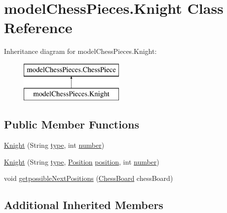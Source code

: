 \hypertarget{classmodel_chess_pieces_1_1_knight}{\section{model\+Chess\+Pieces.\+Knight Class Reference}
\label{classmodel_chess_pieces_1_1_knight}
}
Inheritance diagram for model\+Chess\+Pieces.\+Knight\+:\begin{figure}[H]
\begin{center}
\leavevmode
\includegraphics[height=2.000000cm]{classmodel_chess_pieces_1_1_knight}
\end{center}
\end{figure}
\subsection*{Public Member Functions}
\begin{DoxyCompactItemize}
\item 
\hyperlink{classmodel_chess_pieces_1_1_knight_a147ddcbdf9160932c8b0b386db3954eb}{Knight} (String \hyperlink{classmodel_chess_pieces_1_1_chess_piece_a195487ca88c197af7c1604247be31db2}{type}, int \hyperlink{classmodel_chess_pieces_1_1_chess_piece_a979e63b99128333883acedc38d25dc87}{number})
\item 
\hyperlink{classmodel_chess_pieces_1_1_knight_ac3d5048db997f503429d11d455db2c42}{Knight} (String \hyperlink{classmodel_chess_pieces_1_1_chess_piece_a195487ca88c197af7c1604247be31db2}{type}, \hyperlink{classmodel_core_1_1_position}{Position} \hyperlink{classmodel_chess_pieces_1_1_chess_piece_a3d4362d5b28f6edb14161196d9c6807d}{position}, int \hyperlink{classmodel_chess_pieces_1_1_chess_piece_a979e63b99128333883acedc38d25dc87}{number})
\item 
void \hyperlink{classmodel_chess_pieces_1_1_knight_aa93880a2b4001cc56b91d2afd6c17dc5}{getpossible\+Next\+Positions} (\hyperlink{classmodel_core_1_1_chess_board}{Chess\+Board} chess\+Board)
\end{DoxyCompactItemize}
\subsection*{Additional Inherited Members}


